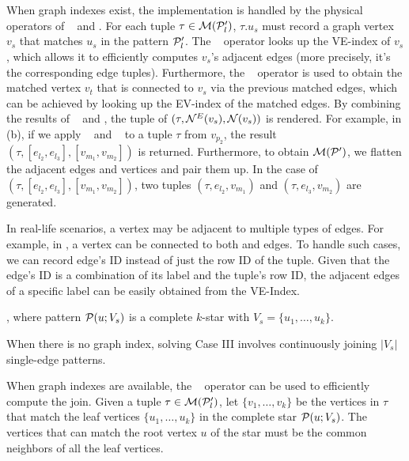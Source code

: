 When graph indexes exist, the implementation is handled by the physical operators of \expandedge~ and \getvertex. For each tuple $\tau \in \mathcal{M}(\mathcal{P}'_l)$, $\tau.u_s$ must record a graph vertex $v_s$ that matches $u_s$ in the pattern $\mathcal{P}'_l$. The \expandedge~ operator looks up the VE-index of $v_s$, which allows it to efficiently computes $v_s$'s adjacent edges (more precisely, it's the corresponding edge tuples). Furthermore, the \getvertex~ operator is used to obtain the matched vertex $v_t$ that is connected to $v_s$ via the previous matched edges, which can be achieved by looking up the EV-index of the matched edges.
By combining the results of \expandedge~ and \getvertex, the tuple of $(\tau, {\mathcal{N}}^E(v_s), {\mathcal{N}}(v_s))$ is rendered. For example, in (b), if we apply \expandedge~ and \getvertex~ to a tuple $\tau$ from $v_{p_2}$, the result $(\tau, [e_{l_2}, e_{l_3}], [v_{m_1}, v_{m_2}])$ is returned.
Furthermore, to obtain $\mathcal{M}(\mathcal{P}')$, we flatten the adjacent edges and vertices and pair them up. In the case of $(\tau, [e_{l_2}, e_{l_3}], [v_{m_1}, v_{m_2}])$, two tuples $(\tau, e_{l_2}, v_{m_1})$ and $(\tau, e_{l_3}, v_{m_2})$ are generated.

In real-life scenarios, a vertex may be adjacent to multiple types of edges. For example, in , a  vertex can be connected to both  and  edges. To handle such cases, we can record edge's ID instead of just the row ID of the tuple. Given that the edge's ID is a combination of its label and the tuple's row ID, the adjacent edges of a specific label can be easily obtained from the VE-Index.

, where pattern $\mathcal{P}(u;V_s)$ is a complete $k$-star with $V_s = \{u_1, \ldots, u_k\}$. %

When there is no graph index, solving Case III involves continuously joining $|V_s|$ single-edge patterns.

When graph indexes are available, the \expandintersect~ operator can be used to efficiently compute the join. Given a tuple $\tau \in \mathcal{M}(\mathcal{P}'_l)$, let $\{v_1, \ldots, v_k\}$ be the vertices in $\tau$ that match the leaf vertices $\{u_1, \ldots, u_k\}$ in the complete star $\mathcal{P}(u;V_s)$. The vertices that can match the root vertex $u$ of the star must be the common neighbors of all the leaf vertices.

